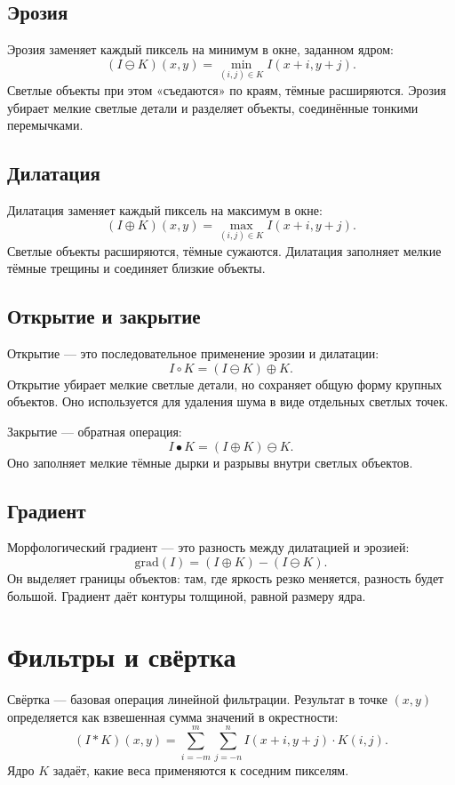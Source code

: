 \documentclass[a4paper,12pt]{article}
\begin{document}
\subsection{Эрозия}

Эрозия заменяет каждый пиксель на минимум в окне, заданном ядром:
\[
(I \ominus K)(x, y) = \min_{(i, j) \in K} I(x + i, y + j).
\]
Светлые объекты при этом «съедаются» по краям, тёмные расширяются. Эрозия убирает мелкие светлые детали и разделяет объекты, соединённые тонкими перемычками.

\subsection{Дилатация}

Дилатация заменяет каждый пиксель на максимум в окне:
\[
(I \oplus K)(x, y) = \max_{(i, j) \in K} I(x + i, y + j).
\]
Светлые объекты расширяются, тёмные сужаются. Дилатация заполняет мелкие тёмные трещины и соединяет близкие объекты.

\subsection{Открытие и закрытие}

Открытие --- это последовательное применение эрозии и дилатации:
\[
I \circ K = (I \ominus K) \oplus K.
\]
Открытие убирает мелкие светлые детали, но сохраняет общую форму крупных объектов. Оно используется для удаления шума в виде отдельных светлых точек.

Закрытие --- обратная операция:
\[
I \bullet K = (I \oplus K) \ominus K.
\]
Оно заполняет мелкие тёмные дырки и разрывы внутри светлых объектов.

\subsection{Градиент}

Морфологический градиент --- это разность между дилатацией и эрозией:
\[
\text{grad}(I) = (I \oplus K) - (I \ominus K).
\]
Он выделяет границы объектов: там, где яркость резко меняется, разность будет большой. Градиент даёт контуры толщиной, равной размеру ядра.

\section{Фильтры и свёртка}

Свёртка --- базовая операция линейной фильтрации. Результат в точке $(x, y)$ определяется как взвешенная сумма значений в окрестности:
\[
(I * K)(x, y) = \sum_{i=-m}^{m} \sum_{j=-n}^{n} I(x + i, y + j) \cdot K(i, j).
\]
Ядро $K$ задаёт, какие веса применяются к соседним пикселям.
\end{document}
